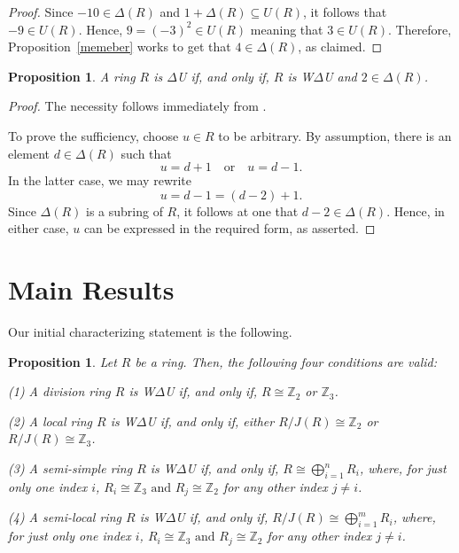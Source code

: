 \documentclass[12pt]{amsart}
\newtheorem{proposition}[theorem]{Proposition}
\theoremstyle{definition}
\begin{document}
\begin{proof}
Since \( -10 \in \Delta(R) \) and \( 1 + \Delta(R) \subseteq U(R) \), it follows that \( -9 \in U(R) \). Hence, \( 9 = (-3)^2 \in U(R) \) meaning that \( 3 \in U(R) \). Therefore, Proposition~\ref{memeber} works to get that \( 4 \in \Delta(R) \), as claimed.
\end{proof}

\begin{proposition}\label{mino}
A ring \(R\) is $\Delta$U if, and only if, \(R\) is W$\Delta$U and \(2 \in \Delta(R)\).
\end{proposition}

\begin{proof}
The necessity follows immediately from \cite[Proposition~2.4(1)]{7}.

To prove the sufficiency, choose \(u \in R\) to be arbitrary. By assumption, there is an element
\(d \in \Delta(R)\) such that
\[
u = d + 1 \quad \text{or} \quad u = d - 1.
\]
In the latter case, we may rewrite
\[
u = d - 1 = (d - 2) + 1.
\]
Since \(\Delta(R)\) is a subring of $R$, it follows at one that \(d - 2 \in \Delta(R)\). Hence, in either case, \(u\) can be expressed in the required form, as asserted.
\end{proof}

\section{Main Results}

Our initial characterizing statement is the following.

\begin{proposition}\label{division}
Let \( R \) be a ring. Then, the following four conditions are valid:
	
(1) A division ring \( R \) is W$\Delta$U if, and only if, \( R \cong \mathbb{Z}_2 \) or \( \mathbb{Z}_3 \).
	
(2) A local ring \( R \) is W$\Delta$U if, and only if, either \( R/J(R) \cong \mathbb{Z}_2 \) or \(R/J(R) \cong  \mathbb{Z}_3 \).
	
(3) A semi-simple ring $R$ is W$\Delta$U if, and only if, $R \cong \bigoplus_{i=1}^n R_i$, where, for just only one index $i$, $R_i\cong \mathbb{Z}_3 \text{ and } R_j\cong \mathbb{Z}_2$ for any other index $j\neq i$.
	
(4) A semi-local ring $R$ is W$\Delta$U if, and only if, $R/J(R) \cong \bigoplus_{i=1}^m R_i$, where, for just only one index $i$, $R_i\cong \mathbb{Z}_3 \text{ and } R_j\cong \mathbb{Z}_2$ for any other index $j\neq i$.	
\end{proposition}
\end{document}

